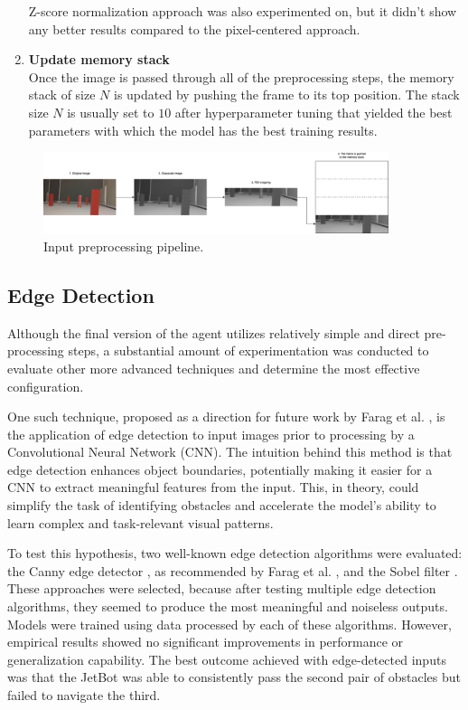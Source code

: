 \begin{enumerate}
    Z-score normalization approach was also experimented on, but it didn't show any better results compared to the pixel-centered approach.

  \item \textbf{Update memory stack} \\
    Once the image is passed through all of the preprocessing steps, the memory stack of size $N$ is updated by pushing the frame to its top position. The stack size $N$ is usually set to $10$ after hyperparameter tuning that yielded the best parameters with which the model has the best training results.
\end{enumerate}

\begin{figure}[htbp]
  \centering
  \includegraphics[width=0.9\textwidth]{Images/preprocessing.png}
  \caption{Input preprocessing pipeline.}
  \label{fig:preprocessing}
\end{figure}

\subsection{Edge Detection}
\label{sec:edge-detection}

Although the final version of the agent utilizes relatively simple and direct pre-processing steps, a substantial amount of experimentation was conducted to evaluate other more advanced techniques and determine the most effective configuration.

One such technique, proposed as a direction for future work by Farag et al. \autocite{8855753}, is the application of edge detection to input images prior to processing by a Convolutional Neural Network (CNN). The intuition behind this method is that edge detection enhances object boundaries, potentially making it easier for a CNN to extract meaningful features from the input. This, in theory, could simplify the task of identifying obstacles and accelerate the model’s ability to learn complex and task-relevant visual patterns.

To test this hypothesis, two well-known edge detection algorithms were evaluated: the Canny edge detector \autocite{canny1986computational}, as recommended by Farag et al. \autocite{8855753}, and the Sobel filter \autocite{sobel2014history}. These approaches were selected, because after testing multiple edge detection algorithms, they seemed to produce the most meaningful and noiseless outputs. Models were trained using data processed by each of these algorithms. However, empirical results showed no significant improvements in performance or generalization capability. The best outcome achieved with edge-detected inputs was that the JetBot was able to consistently pass the second pair of obstacles but failed to navigate the third.

